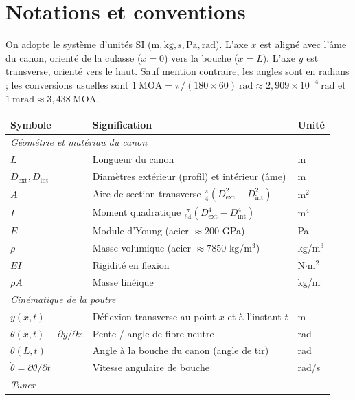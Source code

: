 \documentclass[12pt,a4paper]{article}
\begin{document}
	\section{Notations et conventions}
	\label{sec:notations}

	On adopte le système d'unités SI ($\text{m}, \text{kg}, \text{s}, \text{Pa}, \text{rad}$). L'axe $x$ est aligné avec l'âme du canon, orienté de la culasse ($x=0$) vers la bouche ($x=L$). L'axe $y$ est transverse, orienté vers le haut. Sauf mention contraire, les angles sont en radians ; les conversions usuelles sont
	\(1\ \text{MOA} = \pi/(180 \times 60)\ \text{rad} \approx 2{,}909 \times 10^{-4}\ \text{rad}\) et
	\(1\ \text{mrad} \approx 3{,}438\ \text{MOA}.\)

	\begin{center}
		\renewcommand{\arraystretch}{1.12}
		\begin{tabular}{l l l}
			\toprule
			Symbole & Signification & Unité \\
			\midrule
			\multicolumn{3}{l}{\emph{Géométrie et matériau du canon}} \\
			$L$ & Longueur du canon & m \\
			$D_\text{ext}, D_\text{int}$ & Diamètres extérieur (profil) et intérieur (âme) & m \\
			$A$ & Aire de section transverse $\tfrac{\pi}{4}(D_\text{ext}^2 - D_\text{int}^2)$ & m$^2$ \\
			$I$ & Moment quadratique $\tfrac{\pi}{64}(D_\text{ext}^4 - D_\text{int}^4)$ & m$^4$ \\
			$E$ & Module d'Young (acier $\approx 200$ GPa) & Pa \\
			$\rho$ & Masse volumique (acier $\approx 7850$ kg/m$^3$) & kg/m$^3$ \\
			$EI$ & Rigidité en flexion & N$\cdot$m$^2$ \\
			$\rho A$ & Masse linéique & kg/m \\
			\midrule
			\multicolumn{3}{l}{\emph{Cinématique de la poutre}} \\
			$y(x,t)$ & Déflexion transverse au point $x$ et à l'instant $t$ & m \\
			$\theta(x,t) \equiv \partial y/\partial x$ & Pente / angle de fibre neutre & rad \\
			$\theta(L,t)$ & Angle à la bouche du canon (angle de tir) & rad \\
			$\dot\theta = \partial \theta/\partial t$ & Vitesse angulaire de bouche & rad/s \\
			\midrule
			\multicolumn{3}{l}{\emph{Tuner}} \\

\end{tabular}
\end{center}
\end{document}
